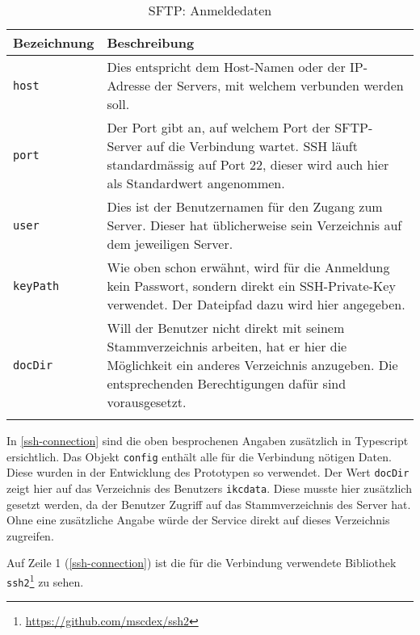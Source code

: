\begin{longtable}{|p{4cm}| p{8cm}|}
  \hline
    \textbf{Bezeichnung} & \textbf{Beschreibung}\\\hline
    \texttt{host} & Dies entspricht dem Host-Namen oder der IP-Adresse der Servers, mit welchem verbunden werden soll.\\\hline
    \texttt{port} & Der Port gibt an, auf welchem Port der \gls{SFTP}-Server auf die Verbindung wartet. \gls{SSH} läuft standardmässig auf Port 22, dieser wird auch hier als Standardwert angenommen.\\\hline
    \texttt{user} & Dies ist der Benutzernamen für den Zugang zum Server. Dieser hat üblicherweise sein Verzeichnis auf dem jeweiligen Server.\\\hline
    \texttt{keyPath} & Wie oben schon erwähnt, wird für die Anmeldung kein Passwort, sondern direkt ein SSH-Private-Key verwendet. Der Dateipfad dazu wird hier angegeben.\\\hline
    \texttt{docDir} & Will der Benutzer nicht direkt mit seinem Stammverzeichnis arbeiten, hat er hier die Möglichkeit ein anderes Verzeichnis anzugeben. Die entsprechenden Berechtigungen dafür sind vorausgesetzt.\\\hline
        \caption{SFTP: Anmeldedaten}
    \label{sftp-anmeldung}
\end{longtable}


In \autoref{ssh-connection} sind die oben besprochenen Angaben zusätzlich in \gls{Typescript} ersichtlich. Das Objekt \texttt{config} enthält alle für die Verbindung nötigen Daten. Diese wurden in der Entwicklung des Prototypen so verwendet. Der Wert \texttt{docDir} zeigt hier auf das Verzeichnis des Benutzers \texttt{ikcdata}. Diese musste hier zusätzlich gesetzt werden, da der Benutzer Zugriff auf das Stammverzeichnis des Server hat. Ohne eine zusätzliche Angabe würde der Service direkt auf dieses Verzeichnis zugreifen.



Auf Zeile 1 (\autoref{ssh-connection}) ist die für die Verbindung verwendete Bibliothek \texttt{ssh2}\footnote{\url{https://github.com/mscdex/ssh2}} zu sehen.




